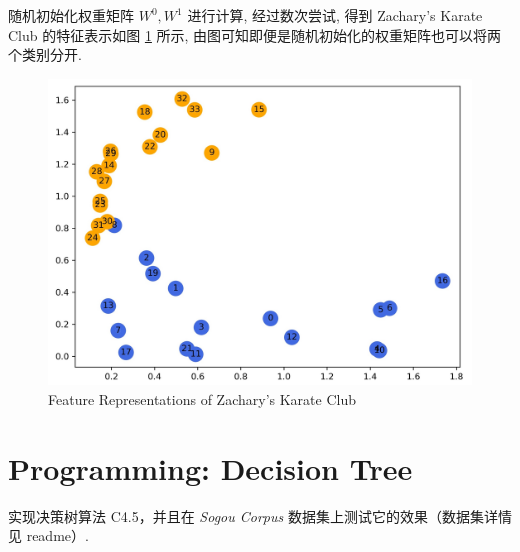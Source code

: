 \documentclass{article}
\begin{document}
随机初始化权重矩阵 $W^0,W^1$ 进行计算, 经过数次尝试, 得到 Zachary's Karate Club 的特征表示如图 \ref{fig:zkc_gcn} 所示, 由图可知即便是随机初始化的权重矩阵也可以将两个类别分开.

\begin{figure}[htbp]
  \centering
  \includegraphics[width=12cm]{zkc_gcn.jpg}
  \caption{Feature Representations of Zachary's Karate Club}
  \label{fig:zkc_gcn}
\end{figure}

\section*{Programming: Decision Tree}

实现决策树算法 C4.5，并且在 \emph{Sogou Corpus} 数据集上测试它的效果（数据集详情见 readme）. 
\end{document}
